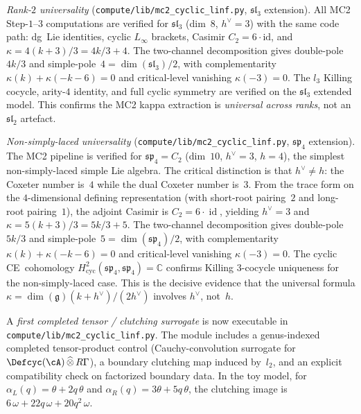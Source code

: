 \item \emph{Rank-$2$ universality}
  \textup{(}\nolinkurl{compute/lib/mc2_cyclic_linf.py}, $\mathfrak{sl}_3$
  extension\textup{)}.
  All MC2 Step-$1$--$3$ computations are verified for
  $\mathfrak{sl}_3$ (dim~$8$, $h^\vee=3$) with the same code path:
  dg~Lie identities, cyclic $L_\infty$ brackets, Casimir
  $C_2=6\cdot\mathrm{id}$, and
  $\kappa = 4(k+3)/3 = 4k/3 + 4$.
  The two-channel decomposition gives double-pole $4k/3$ and
  simple-pole~$4=\dim(\mathfrak{sl}_3)/2$,
  with complementarity $\kappa(k)+\kappa(-k-6)=0$ and
  critical-level vanishing $\kappa(-3)=0$.
  The $l_3$ Killing cocycle, arity-$4$ identity, and full cyclic
  symmetry are verified on the $\mathfrak{sl}_3$ extended model.
  This confirms the MC2 kappa extraction is \emph{universal across ranks},
  not an $\mathfrak{sl}_2$ artefact.

\item \emph{Non-simply-laced universality}
  \textup{(}\nolinkurl{compute/lib/mc2_cyclic_linf.py}, $\mathfrak{sp}_4$
  extension\textup{)}.
  The MC2 pipeline is verified for
  $\mathfrak{sp}_4 = C_2$ (dim~$10$, $h^\vee=3$, $h=4$),
  the simplest non-simply-laced simple Lie algebra.
  The critical distinction is that $h^\vee \neq h$: the Coxeter
  number is~$4$ while the dual Coxeter number is~$3$.
  From the trace form on the $4$-dimensional defining representation
  (with short-root pairing~$2$ and long-root pairing~$1$),
  the adjoint Casimir is $C_2 = 6 \cdot \operatorname{id}$,
  yielding $h^\vee = 3$ and
  $\kappa = 5(k+3)/3 = 5k/3 + 5$.
  The two-channel decomposition gives double-pole $5k/3$ and
  simple-pole~$5 = \dim(\mathfrak{sp}_4)/2$,
  with complementarity $\kappa(k) + \kappa(-k-6) = 0$ and
  critical-level vanishing $\kappa(-3) = 0$.
  The cyclic CE~cohomology
  $H^2_{\mathrm{cyc}}(\mathfrak{sp}_4,\mathfrak{sp}_4) = \mathbb{C}$
  confirms Killing $3$-cocycle uniqueness for the non-simply-laced case.
  This is the decisive evidence that the universal formula
  $\kappa = \dim(\mathfrak{g})(k+h^\vee)/(2h^\vee)$ involves
  $h^\vee$, not~$h$.

\item A \emph{first completed tensor / clutching surrogate}
  is now executable in
  \nolinkurl{compute/lib/mc2_cyclic_linf.py}.
  The module includes a genus-indexed completed tensor-product control
  (Cauchy-convolution surrogate for
  $\Defcyc(\cA)\,\widehat{\otimes}\,R\Gamma$),
  a boundary clutching map induced by~$l_2$,
  and an explicit compatibility check on factorized boundary data.
  In the toy model, for
  $\alpha_L(q)=\theta+2q\,\theta$ and
  $\alpha_R(q)=3\theta+5q\,\theta$, the clutching image is
  $6\,\omega + 22q\,\omega + 20q^2\,\omega$.

